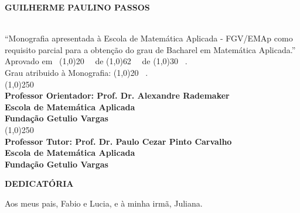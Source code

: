 \documentclass[12pt, a4paper, twoside]{article}
\theoremstyle{definition}
\newcommand{\supervisor}{Alexandre Rademaker}
\begin{document}
\begin{titlepage}
 \begin{center}
 
  {\bf \large \uppercase{Guilherme Paulino Passos}}\\[0.3cm]

  \vspace{25 mm}

  {\bf \large \usetitle}\\[3cm]

  {“Monografia apresentada à Escola de Matemática Aplicada  - FGV/EMAp como requisito parcial para a obtenção do grau de Bacharel em Matemática Aplicada.”}\\[3cm]


  {Aprovado em \ \line(1,0){20} \ \ de \line(1,0){62} \ \ de \line(1,0){30} \ .}\\[0.1cm]
  {Grau atribuido à Monografia: \line(1,0){20} \ . }\\[3cm]
  
  
  {\line(1,0){250}}\\
  {\bf Professor Orientador: Prof. Dr. \supervisor}\\[0.1cm]
  {\bf Escola de Matemática Aplicada}\\[0.1cm]
  {\bf Fundação Getulio Vargas}\\[1.5cm]
  
    {\line(1,0){250}}\\
    {\bf Professor Tutor: Prof. Dr. Paulo Cezar Pinto Carvalho}\\[0.1cm]
    {\bf Escola de Matemática Aplicada}\\[0.1cm]
    {\bf Fundação Getulio Vargas}
 \end{center}
\end{titlepage}

\newpage\null\thispagestyle{empty}\newpage

\newpage
\thispagestyle{empty}

\begin{center}
	\textbf{DEDICATÓRIA}
\end{center}
\vfill

	Aos meus pais, Fabio e Lucia, e à minha irmã, Juliana.

\clearpage

\newpage
\thispagestyle{empty}
\end{document}

